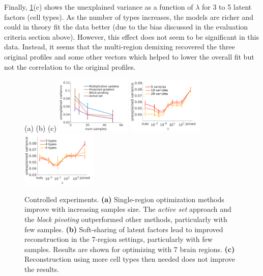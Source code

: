 \documentclass{article} %
\begin{document}
Finally, \ref{fig:controlled_exp}(c) shows the unexplained variance as a function of $\lambda$ for 3 to 5 latent factors (cell types). As the number of types increases, the models are richer and could in theory fit the data better (due to the bias discussed in the evaluation criteria section above). However, this effect does not seem to be significant in this data.  Instead, it seems that the multi-region demixing recovered the three original profiles and some other vectors which helped to lower the overall fit but not the correlation to the original profiles. 
\begin{figure}[!hbt]
   (a) \hspace{120pt}(b) \hspace{120pt}(c) \hspace{190pt}
   \centering
     \includegraphics[width=0.32\textwidth]{methods}
     \includegraphics[width=0.32\textwidth]{lambda_samples}
     \includegraphics[width=0.32\textwidth]{num_types}
    \caption{Controlled experiments. 
    {\bf{(a)}} Single-region optimization methods improve with increasing samples size. The {\em active set} approach and the {\em block pivoting} outperformed other methods, particularly with few samples. {\bf{(b)}} Soft-sharing of latent factors lead to improved reconstruction in the 7-region settings, particularly with few samples. Results are shown for optimizing with 7 brain regions. {\bf{(c)}} Reconstruction using more cell types then needed does not improve the results.} 
    \label{fig:controlled_exp}
\end{figure}
\end{document}
